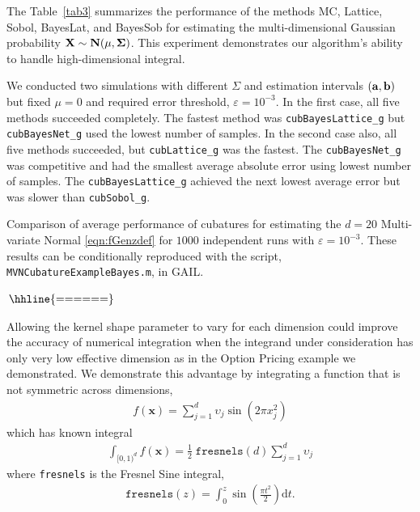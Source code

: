 \documentclass{iitthesis}          %
\newcommand{\bm}[1]{\boldsymbol{#1}}
\newcommand{\dif}[1]{\text{d}{#1}}
\newcommand{\vx}{\bm{x}}
\newcommand{\dt}{\dif{{t}}}
\newcommand{\code}[1]{\texttt{#1}}
\newcommand{\JRNote}[1]{}
\begin{document}
{{{{{{
The Table~\ref{tab3} summarizes the performance of the methods MC, Lattice, Sobol,
BayesLat, and BayesSob for estimating the multi-dimensional Gaussian probability $\bf{X}\sim N(\bf{\mu},\Sigma)$. This experiment demonstrates our algorithm's ability to handle  high-dimensional integral.

We conducted two simulations with different $\Sigma$ and estimation intervals $(\bf{a}, \bf{b})$ but fixed $\mu=0$ and required error threshold, $\varepsilon=10^{-3}$. In the first case, all five methods succeeded completely. 
The fastest method was \code{cubBayesLattice\_g} but \code{cubBayesNet\_g} used the lowest number of samples.
In the second case also, all five methods succeeded,  but \code{cubLattice\_g} was the fastest. 
The \code{cubBayesNet\_g}  was competitive and had the smallest average absolute error using lowest number of samples. The \code{cubBayesLattice\_g} achieved the next lowest average error but was slower than \code{cubSobol\_g}.

\begin{table}[ht] %
\centering
\caption{Comparison of average performance of cubatures for estimating the $d=20$ Multi-variate Normal \eqref{eqn:fGenzdef} for $1000$ independent runs with $\varepsilon=10^{-3}$. These results can be conditionally reproduced with the script, \code{MVNCubatureExampleBayes.m}, in GAIL. 
\label{tab3}}	   
$
\arraycolsep=1.4pt\def\arraystretch{0.9}
\begin{array}{l@{\quad}r@{\quad}r@{\quad}r@{\quad}r@{\quad}r@{\quad}r}
\hhline{======}
 
\end{array}
$
\end{table}


\clearpage










\JRNote{ Numerical examples for the case of shape parameter per dimension }

Allowing the kernel shape parameter to vary for each dimension could improve the accuracy of numerical integration when the integrand under consideration has only very low effective dimension  as in the Option Pricing example we demonstrated. We demonstrate this advantage by integrating a function that is not symmetric across dimensions,
\begin{align}
\label{eqn:fresnels}
f(\vx) = \sum_{j=1}^d \upsilon_j \sin(2 \pi x_j^2)
\end{align} 
which has known integral
\begin{align*}
\int_{[0,1)^d} f(\vx)  = \frac{1}{2} \; \code{fresnels}(d) \sum_{j=1}^{d} \upsilon_j
\end{align*}
where \code{fresnels} is the Fresnel Sine integral,
\begin{align*}
\code{fresnels}(z) = \int_{0}^{z} \sin \left( \frac{\pi t^2}{2} \right) \dt.
\end{align*}


}}}}}}
\end{document}
